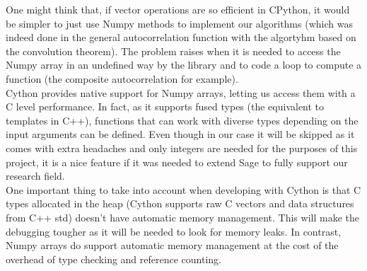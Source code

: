 
One might think that, if vector operations are so efficient in CPython, it would
be simpler to just use Numpy methods to implement our algorithms (which was
indeed done in the general autocorrelation function with the algortyhm
based on the convolution theorem). The problem raises when it is needed to
access the Numpy array in an undefined way by the library and to code a loop to
compute a function (the composite autocorrelation for example).\\

Cython provides native support for Numpy arrays, letting us access them with a
C level performance. In fact, as it supports fused types (the equivalent to
templates in C++), functions that can work with diverse types
depending on the input arguments can be defined. Even though in our case it will
be skipped as it comes with extra headaches and only integers are needed for the
purposes of this project, it is a nice feature if it was needed to extend Sage to
fully support our research field.\\

One important thing to take into account when developing with Cython is that
C types allocated in the heap (Cython supports raw C vectors and data structures
from C++ std) doesn't have automatic memory management. This will make the
debugging tougher as it will be needed to look for memory leaks. In contrast,
Numpy arrays do support automatic memory management at the cost of the overhead
of type checking and reference counting.\\
